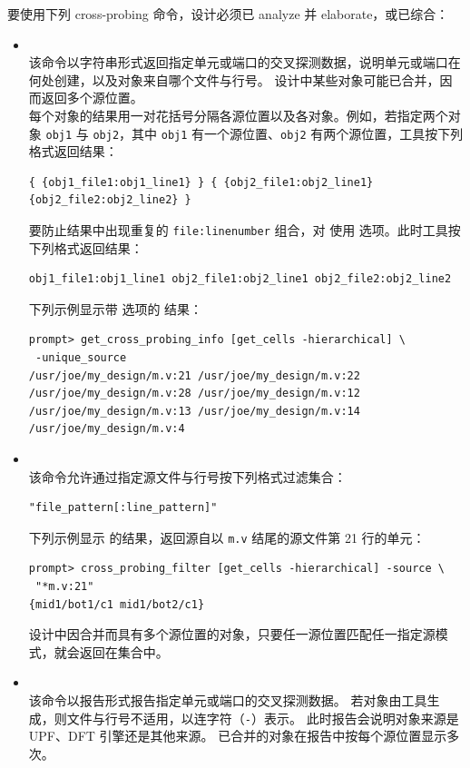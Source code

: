 要使用下列 cross-probing 命令，设计必须已 analyze 并 elaborate，或已综合：
\begin{itemize}
  \item {}\\
        该命令以字符串形式返回指定单元或端口的交叉探测数据，说明单元或端口在何处创建，以及对象来自哪个文件与行号。
        设计中某些对象可能已合并，因而返回多个源位置。\\
        每个对象的结果用一对花括号分隔各源位置以及各对象。例如，若指定两个对象 \texttt{obj1} 与 \texttt{obj2}，其中 \texttt{obj1} 有一个源位置、\texttt{obj2} 有两个源位置，工具按下列格式返回结果：
\begin{lstlisting}
{ {obj1_file1:obj1_line1} } { {obj2_file1:obj2_line1}
{obj2_file2:obj2_line2} }
\end{lstlisting}
        要防止结果中出现重复的 \texttt{file:linenumber} 组合，对  使用  选项。此时工具按下列格式返回结果：
\begin{lstlisting}
obj1_file1:obj1_line1 obj2_file1:obj2_line1 obj2_file2:obj2_line2
\end{lstlisting}
        下列示例显示带  选项的  结果：
\begin{lstlisting}
prompt> get_cross_probing_info [get_cells -hierarchical] \
 -unique_source
/usr/joe/my_design/m.v:21 /usr/joe/my_design/m.v:22
/usr/joe/my_design/m.v:28 /usr/joe/my_design/m.v:12
/usr/joe/my_design/m.v:13 /usr/joe/my_design/m.v:14
/usr/joe/my_design/m.v:4
\end{lstlisting}

  \item {}\\
        该命令允许通过指定源文件与行号按下列格式过滤集合：
\begin{lstlisting}
"file_pattern[:line_pattern]"
\end{lstlisting}
        下列示例显示  的结果，返回源自以 \texttt{m.v} 结尾的源文件第 21 行的单元：
\begin{lstlisting}
prompt> cross_probing_filter [get_cells -hierarchical] -source \
 "*m.v:21"
{mid1/bot1/c1 mid1/bot2/c1}
\end{lstlisting}
        设计中因合并而具有多个源位置的对象，只要任一源位置匹配任一指定源模式，就会返回在集合中。

  \item {}\\
        该命令以报告形式报告指定单元或端口的交叉探测数据。
        若对象由工具生成，则文件与行号不适用，以连字符（\texttt{-}）表示。
        此时报告会说明对象来源是 UPF、DFT 引擎还是其他来源。
        已合并的对象在报告中按每个源位置显示多次。
\end{itemize}

